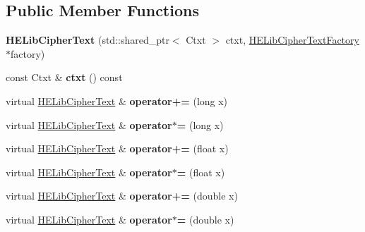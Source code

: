 \subsection*{Public Member Functions}
\begin{DoxyCompactItemize}
\item 
\mbox{\label{classHELibCipherText_abd011478fe2945c0feec8eff1fa317f1}} 
{\bfseries H\+E\+Lib\+Cipher\+Text} (std\+::shared\+\_\+ptr$<$ Ctxt $>$ ctxt, \hyperlink{classHELibCipherTextFactory}{H\+E\+Lib\+Cipher\+Text\+Factory} $\ast$factory)
\item 
\mbox{\label{classHELibCipherText_a62abdb390c87479c5f622570fd7b5f8b}} 
const Ctxt \& {\bfseries ctxt} () const
\item 
\mbox{\label{classHELibCipherText_a186826b8e297a2587f0b5ddc9567cde4}} 
virtual \hyperlink{classHELibCipherText}{H\+E\+Lib\+Cipher\+Text} \& {\bfseries operator+=} (long x)
\item 
\mbox{\label{classHELibCipherText_ad36eb42b8d0208fc5903fe9f2969ffa3}} 
virtual \hyperlink{classHELibCipherText}{H\+E\+Lib\+Cipher\+Text} \& {\bfseries operator$\ast$=} (long x)
\item 
\mbox{\label{classHELibCipherText_a747f98ae50587783a2192618701bbc8c}} 
virtual \hyperlink{classHELibCipherText}{H\+E\+Lib\+Cipher\+Text} \& {\bfseries operator+=} (float x)
\item 
\mbox{\label{classHELibCipherText_af8e5454f98c8af7fdd5bbf9d96428f31}} 
virtual \hyperlink{classHELibCipherText}{H\+E\+Lib\+Cipher\+Text} \& {\bfseries operator$\ast$=} (float x)
\item 
\mbox{\label{classHELibCipherText_aa0460b1883958db2e30c638a8192ceb5}} 
virtual \hyperlink{classHELibCipherText}{H\+E\+Lib\+Cipher\+Text} \& {\bfseries operator+=} (double x)
\item 
\mbox{\label{classHELibCipherText_a4244fa5db6b3ce11b420e18acb3be763}} 
virtual \hyperlink{classHELibCipherText}{H\+E\+Lib\+Cipher\+Text} \& {\bfseries operator$\ast$=} (double x)
\item 

\end{DoxyCompactItemize}
